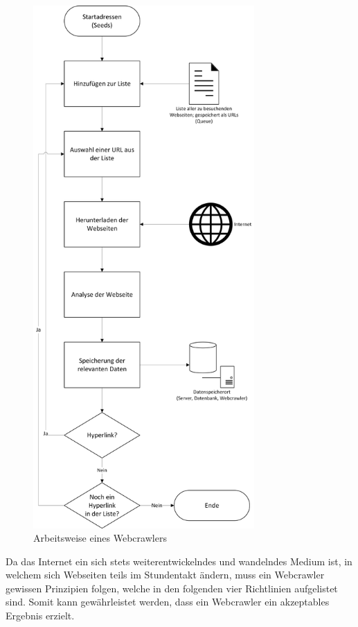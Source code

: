 \begin{figure}[H]
	\centering
	\includegraphics[width=8.45cm]{img/flussdiagramm-ablauf-webcrawler-neu.png}
	\caption{Arbeitsweise eines Webcrawlers}
	\label{fig:arbeitsweise_crawler}
\end{figure}
Da das Internet ein sich stets weiterentwickelndes und wandelndes Medium ist, in welchem sich Webseiten teils im Stundentakt ändern, muss ein Webcrawler gewissen Prinzipien folgen, welche in den folgenden vier Richtlinien aufgelistet sind\cite[265-267]{ijcsc-web-crawler-overview}. Somit kann gewährleistet werden, dass ein Webcrawler ein akzeptables Ergebnis erzielt.
